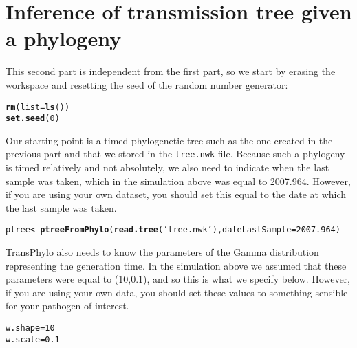 \documentclass[a4paper]{article}\usepackage[]{graphicx}\usepackage[]{color}
\makeatletter
\newcommand{\hlnum}[1]{\textcolor[rgb]{0.686,0.059,0.569}{#1}}%
\newcommand{\hlstr}[1]{\textcolor[rgb]{0.192,0.494,0.8}{#1}}%
\newcommand{\hlstd}[1]{\textcolor[rgb]{0.345,0.345,0.345}{#1}}%
\newcommand{\hlkwb}[1]{\textcolor[rgb]{0.69,0.353,0.396}{#1}}%
\newcommand{\hlkwc}[1]{\textcolor[rgb]{0.333,0.667,0.333}{#1}}%
\newcommand{\hlkwd}[1]{\textcolor[rgb]{0.737,0.353,0.396}{\textbf{#1}}}%
\newenvironment{kframe}{%
 \def\at@end@of@kframe{}%
 \ifinner\ifhmode%
  \def\at@end@of@kframe{\end{minipage}}%
  \begin{minipage}{\columnwidth}%
 \fi\fi%
 \def\FrameCommand##1{\hskip\@totalleftmargin \hskip-\fboxsep
 \colorbox{shadecolor}{##1}\hskip-\fboxsep
     \hskip-\linewidth \hskip-\@totalleftmargin \hskip\columnwidth}%
 \MakeFramed {\advance\hsize-\width
   \@totalleftmargin\z@ \linewidth\hsize
   \@setminipage}}%
 {\par\unskip\endMakeFramed%
 \at@end@of@kframe}
\newenvironment{knitrout}{}{} %
\makeatother
\begin{document}
\section{Inference of transmission tree given a phylogeny}

This second part is independent from the first part, so we start by erasing the workspace and resetting the seed of the random number generator:

\begin{knitrout}
\color{fgcolor}\begin{kframe}
\begin{alltt}
\hlkwd{rm}\hlstd{(}\hlkwc{list}\hlstd{=}\hlkwd{ls}\hlstd{())}
\hlkwd{set.seed}\hlstd{(}\hlnum{0}\hlstd{)}
\end{alltt}
\end{kframe}
\end{knitrout}

Our starting point is a timed phylogenetic tree such as the one created in the previous part and that we stored in the \verb+tree.nwk+ file. Because such a phylogeny is timed relatively and not absolutely, we also need to indicate when the last sample was taken, which in the simulation above was equal to 2007.964. However, if you are using your own dataset, you should set this equal to the date at which the last sample was taken.

\begin{knitrout}
\color{fgcolor}\begin{kframe}
\begin{alltt}
\hlstd{ptree}\hlkwb{<-}\hlkwd{ptreeFromPhylo}\hlstd{(}\hlkwd{read.tree}\hlstd{(}\hlstr{'tree.nwk'}\hlstd{),}\hlkwc{dateLastSample}\hlstd{=}\hlnum{2007.964}\hlstd{)}
\end{alltt}
\end{kframe}
\end{knitrout}

TransPhylo also needs to know the parameters of the Gamma distribution representing the generation time. In the simulation above we assumed that these parameters were equal to (10,0.1), and so this is what we specify below. However, if you are using your own data, you should set these values to something sensible for your pathogen of interest.
\begin{knitrout}
\color{fgcolor}\begin{kframe}
\begin{alltt}
\hlstd{w.shape}\hlkwb{=}\hlnum{10}
\hlstd{w.scale}\hlkwb{=}\hlnum{0.1}
\end{alltt}
\end{kframe}
\end{knitrout}
\end{document}
